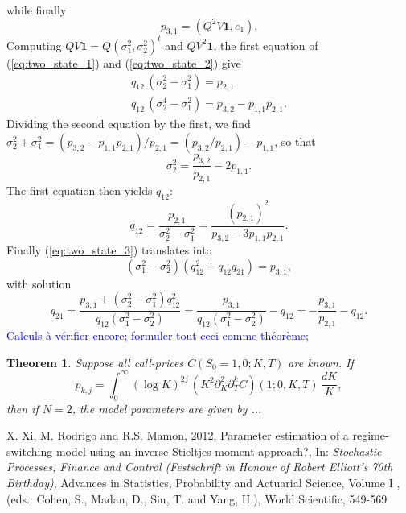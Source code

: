 \documentclass[a4paper, 11pt]{amsart}
\newtheorem{theorem}{Theorem}[section]
\newtheorem{definition and theorem}[theorem]{Definition and   
Theorem}
\begin{document}
while finally
\begin{equation} \label{eq:two_state_3}
    p_{3, 1 } = (Q^2 V \mathbf{1 } , e_1 ) .
\end{equation}
Computing $Q V \mathbf{1 } = Q (\sigma _1 ^2 , \sigma _2 ^2 )^t $ and $Q V^2 \mathbf{1 } $, the first equation of (\ref{eq:two_state_1}) and (\ref{eq:two_state_2}) give
$$
    \begin{array}{ll}
        q_{12 } \, (\sigma _2 ^2 - \sigma _1 ^2 ) = p_{2, 1 } \\
        q_{12 } \, (\sigma _2 ^4 - \sigma _1 ^2 ) = p_{3, 2 } - p_{1, 1 } p_{2, 1 } .
    \end{array}
$$
Dividing the second equation by the first, we find $\sigma _2 ^2 + \sigma _1 ^2 = (p_{3 , 2 } - p_{1, 1 } p_{2, 1 } ) / p_{2, 1 } = (p_{3 , 2 } / p_{2, 1 } ) - p_{1, 1 }  $, so that
$$
    \sigma _2 ^2 = \frac{p_{3, 2 } }{p_{2, 1 } } - 2 p_{1, 1 } .
$$
The first equation then yields $q_{12 } $:
$$
    q_{12 } = \frac{p_{2, 1 } }{\sigma _2 ^2 - \sigma _1 ^2 } = \frac{(p_{2, 1 } )^2 }{p_{3, 2 } - 3 p_{1, 1 } p_{2, 1 } } .
$$
Finally (\ref{eq:two_state_3}) translates into
$$
    (\sigma _1 ^2 - \sigma _2 ^2 ) (q_{12 }^2 + q_{12 } q_{21 } ) = p_{3, 1 } ,
$$
with solution
$$
    q_{21 } = \frac{p_{3, 1 } + (\sigma _2 ^2 - \sigma _1 ^2 ) q_{12 } ^2 }{q_{12 } (\sigma _1 ^2 - \sigma _2 ^2 ) } = \frac{p_{3, 1 } }{q_{12 } (\sigma _1 ^2 - \sigma _2 ^2 ) } - q_{12 } = - \frac{p_{3, 1 } }{p_{2, 1 } } - q_{12 } .
$$
\textcolor{blue}{Calculs \`a v\'erifier encore; formuler tout ceci comme th\'eor\`eme;  }

\begin{theorem} Suppose all call-prices $C (S_0 = 1 , 0 ; K, T ) $ are known. If
    \begin{equation}
        p_{k, j } = \int _0 ^{\infty } (\log K )^{2j } \, \left( K^2 \partial _K ^2 \partial _T ^k C \right) (1 ; 0 , K, T ) \, \frac{dK }{K } ,
    \end{equation}
    then if $N = 2 $, the model parameters are given by ...
\end{theorem}

\begin{thebibliography}{article}

     X. Xi, M. Rodrigo and R.S. Mamon, 2012, Parameter estimation of a regime-switching model using an inverse Stieltjes moment approach?, In: {\it Stochastic Processes, Finance and Control (Festschrift in Honour of Robert Elliott's 70th Birthday)}, Advances in Statistics, Probability and Actuarial Science, Volume I , (eds.: Cohen, S., Madan, D., Siu, T. and Yang, H.), World Scientific, 549-569

\end{thebibliography}
\end{document}
